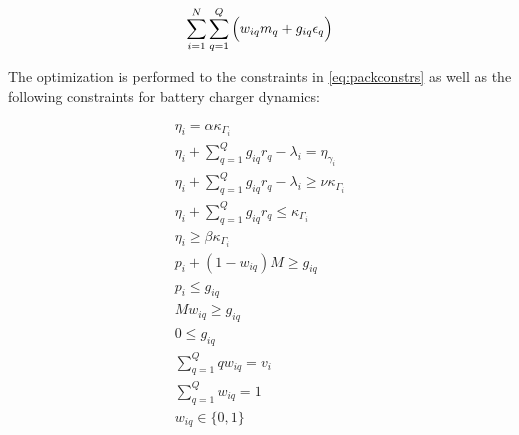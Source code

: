 \documentclass[letterpaper, 10pt, conference]{IEEEtran}
\begin{document}
\begin{equation}
\label{eq:objective}
	\sum_{i=1}^N \sum_{q=1}^Q \Big( w_{iq} m_q + g_{iq} \epsilon_q \Big) \\
\end{equation}

\noindent
The optimization is performed to the constraints in \eqref{eq:packconstrs} as well as the following constraints for battery charger dynamics:

\begin{subequations}
\label{eq:dynconstrs}
\begin{align}
    \eta_i = \alpha \kappa_{\Gamma_i}                                    \label{subeq:init_charge}  \\
    \eta_i + \sum_{q=1}^Q g_{iq} r_q - \lambda_i = \eta_{\gamma_i}          \label{subeq:next_charge}  \\
    \eta_i + \sum_{q=1}^Q g_{iq} r_q - \lambda_i \geq \nu \kappa_{\Gamma_i} \label{subeq:min_charge}   \\
    \eta_i + \sum_{q=1}^Q g_{iq} r_q \leq \kappa_{\Gamma_i}                 \label{subeq:max_charge}   \\
    \eta_i \geq \beta \kappa_{\Gamma_i}                                   \label{subeq:final_charge} \\
    p_i + (1 - w_{iq})M \geq g_{iq}                                      \label{subeq:gpgret}       \\
    p_i \leq g_{iq}                                                     \label{subeq:gples}        \\
    Mw_{iq} \geq g_{iq}                                                  \label{subeq:gwgret}       \\
    0 \leq g_{iq}                                                       \label{subeq:gwles}        \\
    \sum_{q=1}^Q qw_{iq} = v_i                                            \label{subeq:wmax}         \\
    \sum_{q=1}^Q w_{iq} = 1                                               \label{subeq:wone}         \\
    w_{iq} \in \{0,1\}                                                   \label{subeq:wspace}
\end{align}
\end{subequations}
\end{document}
